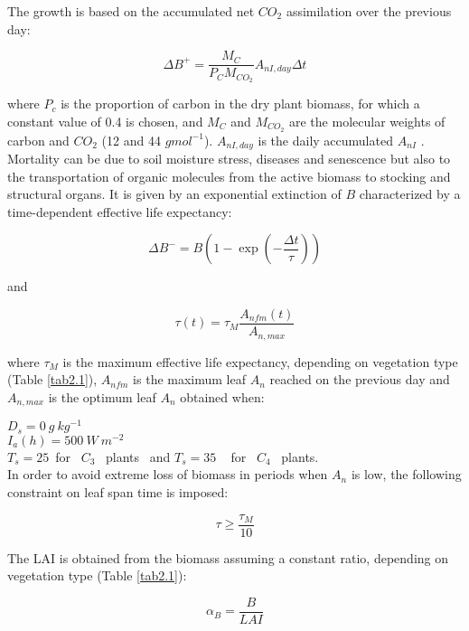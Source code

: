 {The growth is based on the accumulated net $CO_{2}$ assimilation over the previous day:

\begin{equation}
\Delta B^{+} = \frac{M_{C}}{P_{C}M_{CO_{2}}}A_{nI,day}\Delta t
\end{equation}

where $P_{c}$ is the proportion of carbon in the dry plant biomass, for which a constant value of 0.4 is
chosen, and $M_{C}$ and $M_{CO_{2}}$ are the molecular weights of carbon and $CO_{2}$ (12 and 44 $g mol^{-1}$). $A_{nI,day}$ is
the daily accumulated $A_{nI}$ . Mortality can be due to soil moisture stress, diseases and senescence but
also to the transportation of organic molecules from the active biomass to stocking and structural
organs. It is given by an exponential extinction of $B$ characterized by a time-dependent effective life
expectancy:

\begin{equation}\label{eq42}
\Delta B^{-} = B \left ( 1-\exp \left ( -\frac{\Delta t}{\tau} \right ) \right )
\end{equation}

and

\begin{equation}\label{eq43}
\tau(t)= \tau_{M} \frac{A_{nfm}(t)}{A_{n,max}}
\end{equation}

where $\tau_{M}$ is the maximum effective life expectancy, depending on vegetation type (Table \ref{tab2.1}), $A_{nfm}$ is
the maximum leaf $A_{n}$ reached on the previous day and $A_{n,max}$ is the optimum leaf $A_{n}$ obtained when:

$D_{s}=0 ~g ~kg^{-1}$ \\
$I_{a}(h)=500 ~W ~m^{-2}$ \\
$T_{s}=25$\textcelsius ~for ~$C_{3}$ ~plants ~and $T_{s}=35$ \textcelsius ~ for ~$C_{4}$ ~plants. \\

In order to avoid extreme loss of biomass in periods when $A_{n}$ is low, the following constraint on leaf
span time is imposed:

\begin{equation}
\tau \ge \frac{\tau_{M}}{10}
\end{equation}

The LAI is obtained from the biomass assuming a constant ratio, depending on vegetation type (Table
\ref{tab2.1}):

\begin{equation}
\alpha_{B} = \frac{B}{LAI}
\end{equation}

}
